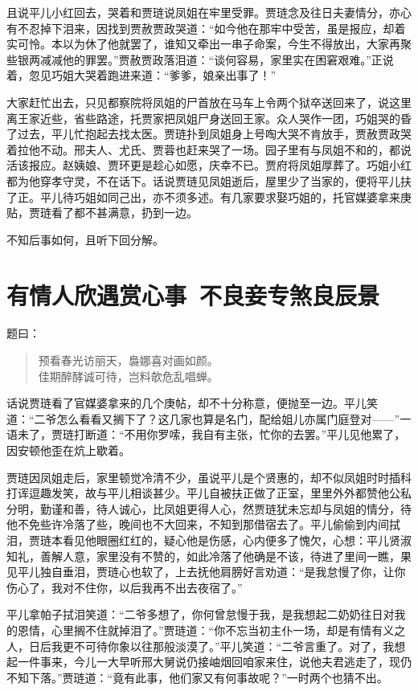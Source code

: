 \documentclass[12pt,oneside]{book}
\newenvironment{shici}{%
\begin{verse}%
\centering\large\hspace{12pt}}%
{\end{verse}}
\begin{document}
且说平儿小红回去，哭着和贾琏说凤姐在牢里受罪。贾琏念及往日夫妻情分，亦心有不忍掉下泪来，因找到贾赦贾政哭道：“如今他在那牢中受苦，虽是报应，却着实可怜。本以为休了他就罢了，谁知又牵出一串子命案，今生不得放出，大家再聚些银两减减他的罪罢。”贾赦贾政落泪道：“谈何容易，家里实在困窘艰难。”正说着，忽见巧姐大哭着跑进来道：“爹爹，娘亲出事了！”

大家赶忙出去，只见都察院将凤姐的尸首放在马车上令两个狱卒送回来了，说这里离王家近些，省些路途，托贾家把凤姐尸身送回王家。众人哭作一团，巧姐哭的昏了过去，平儿忙抱起去找太医。贾琏扑到凤姐身上号啕大哭不肯放手，贾赦贾政哭着拉他不动。邢夫人、尤氏、贾蓉也赶来哭了一场。园子里有与凤姐不和的，都说活该报应。赵姨娘、贾环更是趁心如愿，庆幸不已。贾府将凤姐厚葬了。巧姐小红都为他穿孝守灵，不在话下。话说贾琏见凤姐逝后，屋里少了当家的，便将平儿扶了正。平儿待巧姐如同己出，亦不须多述。有几家要求娶巧姐的，托官媒婆拿来庚贴，贾琏看了都不甚满意，扔到一边。

不知后事如何，且听下回分解。
 
 
\chapter{有情人欣遇赏心事~不良妾专煞良辰景}
题曰：

\begin{shici}
预看春光访丽天，裊娜喜对画如颜。\\
佳期醉酵诚可待，岂料欹危乱唱蝉。
\end{shici}


话说贾琏看了官媒婆拿来的几个庚帖，却不十分称意，便抛至一边。平儿笑道：“二爷怎么看看又搁下了？这几家也算是名门，配给姐儿亦属门庭登对——”一语未了，贾琏打断道：“不用你罗嗦，我自有主张，忙你的去罢。”平儿见他累了，因安顿他歪在炕上歇着。

贾琏因凤姐走后，家里顿觉冷清不少，虽说平儿是个贤惠的，却不似凤姐时时插科打诨逗趣发笑，故与平儿相谈甚少。平儿自被扶正做了正室，里里外外都赞他公私分明，勤谨和善，待人诚心，比凤姐更得人心，然贾琏犹未忘却与凤姐的情分，待他不免些许冷落了些，晚间也不大回来，不知到那借宿去了。平儿偷偷到内间拭泪，贾琏本看见他眼圈红红的，疑心他是伤感，心内便多了愧欠，心想：平儿贤淑知礼，善解人意，家里没有不赞的，如此冷落了他确是不该，待进了里间一瞧，果见平儿独自垂泪，贾琏心也软了，上去抚他肩膀好言劝道：“是我怠慢了你，让你伤心了，我对不住你，以后我再不出去夜宿了。”

平儿拿帕子拭泪笑道：“二爷多想了，你何曾怠慢于我，是我想起二奶奶往日对我的恩情，心里搁不住就掉泪了。”贾琏道：“你不忘当初主仆一场，却是有情有义之人，日后我更不可待你象以往那般淡漠了。”平儿笑道：“二爷言重了。对了，我想起一件事来，今儿一大早听邢大舅说仍接岫烟回咱家来住，说他夫君逃走了，现仍不知下落。”贾琏道：“竟有此事，他们家又有何事故呢？”一时两个也猜不出。
\end{document}
